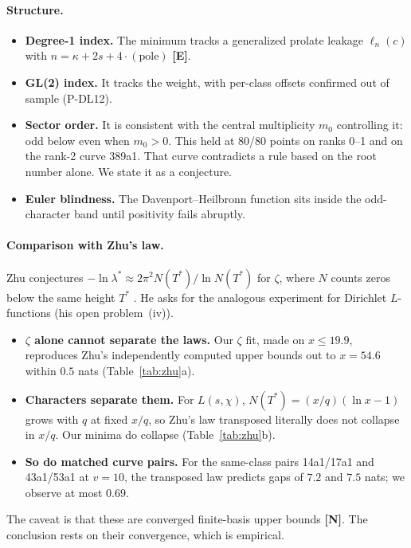 \documentclass[11pt]{article}
\theoremstyle{remark}
\newcommand{\tagE}{\textbf{[E]}}
\newcommand{\tagN}{\textbf{[N]}}
\begin{document}
\paragraph{Structure.}
\begin{itemize}
\item \textbf{Degree-1 index.} The minimum tracks a generalized prolate leakage $\ell_n(c)$ with $n=\kappa+2s+4\cdot(\text{pole})$ \tagE.
\item \textbf{GL(2) index.} It tracks the weight, with per-class offsets confirmed out of sample (P-DL12).
\item \textbf{Sector order.} It is consistent with the central multiplicity $m_0$ controlling it: odd below even when $m_0>0$. This held at 80/80 points on ranks 0--1 and on the rank-2 curve 389a1. That curve contradicts a rule based on the root number alone. We state it as a conjecture.
\item \textbf{Euler blindness.} The Davenport--Heilbronn function sits inside the odd-character band until positivity fails abruptly.
\end{itemize}

\paragraph{Comparison with Zhu's law.} Zhu conjectures $-\ln\lambda^*\approx2\pi^2N(T^*)/\ln N(T^*)$ for $\zeta$, where $N$ counts zeros below the same height $T^*$ \cite{zhu26}. He asks for the analogous experiment for Dirichlet $L$-functions (his open problem~(iv)).
\begin{itemize}
\item \textbf{$\zeta$ alone cannot separate the laws.} Our $\zeta$ fit, made on $x\le19.9$, reproduces Zhu's independently computed upper bounds out to $x=54.6$ within $0.5$ nats (Table~\ref{tab:zhu}a).
\item \textbf{Characters separate them.} For $L(s,\chi)$, $N(T^*)=(x/q)(\ln x-1)$ grows with $q$ at fixed $x/q$, so Zhu's law transposed literally does not collapse in $x/q$. Our minima do collapse (Table~\ref{tab:zhu}b).
\item \textbf{So do matched curve pairs.} For the same-class pairs 14a1/17a1 and 43a1/53a1 at $v=10$, the transposed law predicts gaps of $7.2$ and $7.5$ nats; we observe at most $0.69$.
\end{itemize}
The caveat is that these are converged finite-basis upper bounds \tagN. The conclusion rests on their convergence, which is empirical.
\end{document}
